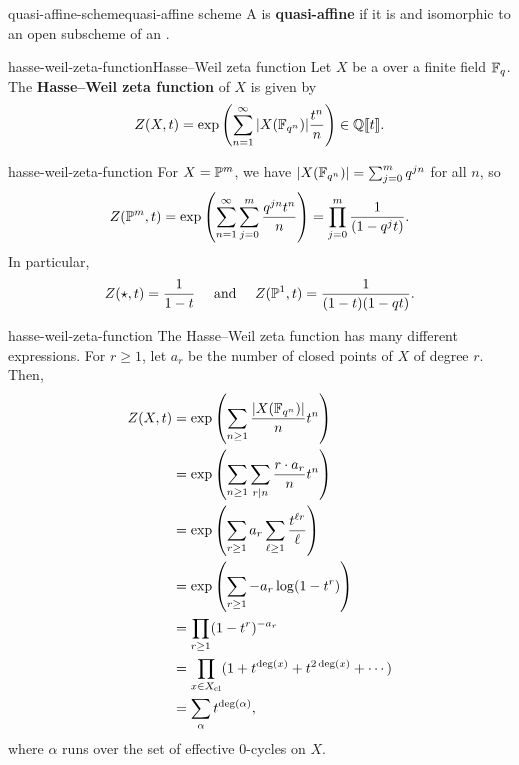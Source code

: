 \begin{topic}{quasi-affine-scheme}{quasi-affine scheme}
    A  is \textbf{quasi-affine} if it is  and isomorphic to an open subscheme of an .
\end{topic}

\begin{topic}{hasse-weil-zeta-function}{Hasse--Weil zeta function}
    Let $X$ be a  over a finite field $\mathbb{F}_q$. The \textbf{Hasse--Weil zeta function} of $X$ is given by
    \[ Z(X, t) = \exp \left( \sum_{n = 1}^{\infty} |X(\mathbb{F}_{q^n})| \frac{t^n}{n} \right) \in \mathbb{Q} \llbracket t \rrbracket . \]
\end{topic}

\begin{example}{hasse-weil-zeta-function}
    For $X = \mathbb{P}^m$, we have $|X(\mathbb{F}_{q^n})| = \sum_{j = 0}^{m} q^{jn}$ for all $n$, so
    \[ Z(\mathbb{P}^m, t) = \exp \left( \sum_{n = 1}^{\infty} \sum_{j = 0}^{m} \frac{q^{jn} t^n}{n} \right) = \prod_{j = 0}^{m} \frac{1}{(1 - q^j t)} . \]
    In particular,
    \[ Z(\star, t) = \frac{1}{1 - t} \quad \textup{ and } \quad Z(\mathbb{P}^1, t) = \frac{1}{(1 - t)(1 - qt)} . \]
\end{example}

\begin{example}{hasse-weil-zeta-function}
    The Hasse--Weil zeta function has many different expressions. For $r \ge 1$, let $a_r$ be the number of closed points of $X$ of degree $r$. Then,
    \[ \begin{aligned}
        Z(X, t)
            &= \exp \left( \sum_{n \ge 1} \frac{|X(\mathbb{F}_{q^n})|}{n} t^n \right) \\
            &= \exp \left( \sum_{n \ge 1} \sum_{r | n} \frac{r \cdot a_r}{n} t^n \right) \\
            &= \exp \left( \sum_{r \ge 1} a_r \sum_{\ell \ge 1} \frac{t^{\ell r}}{\ell} \right) \\
            &= \exp \left( \sum_{r \ge 1} - a_r \log (1 - t^r) \right) \\
            &= \prod_{r \ge 1} (1 - t^r)^{-a_r} \\
            &= \prod_{x \in X_{\textup{cl}}} (1 + t^{\deg(x)} + t^{2 \deg(x)} + \cdots) \\
            &= \sum_{\alpha} t^{\deg(\alpha)} ,
    \end{aligned}\]
    where $\alpha$ runs over the set of effective $0$-cycles on $X$.
\end{example}

